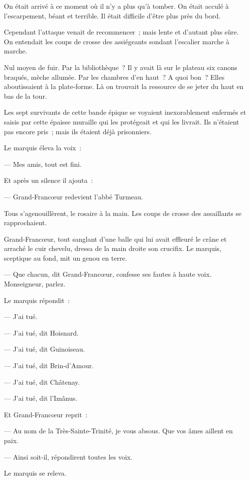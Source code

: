 \documentclass[french,twoside]{book} %
\begin{document}
On était arrivé à ce moment où il n’y a plus qu’à tomber. On était acculé à l’escarpement, béant et terrible. Il était difficile d’être plus près du bord.\par
Cependant l’attaque venait de recommencer ; mais lente et d’autant plus sûre. On entendait les coups de crosse des assiégeants sondant l’escalier marche à marche.\par
Nul moyen de fuir. Par la bibliothèque ? Il y avait là sur le plateau six canons braqués, mèche allumée. Par les chambres d’en haut ? A quoi bon ? Elles aboutissaient à la plate-forme. Là on trouvait la ressource de se jeter du haut en bas de la tour.\par
Les sept survivants de cette bande épique se  voyaient inexorablement enfermés et saisis par cette épaisse muraille qui les protégeait et qui les livrait. Ils n’étaient pas encore pris ; mais ils étaient déjà prisonniers.\par
Le marquis éleva la voix :\par
— Mes amis, tout est fini.\par
Et après un silence il ajouta :\par
— Grand-Francœur redevient l’abbé Turmeau.\par
Tous s’agenouillèrent, le rosaire à la main. Les coups de crosse des assaillants se rapprochaient.\par
Grand-Francœur, tout sanglant d’une balle qui lui avait effleuré le crâne et arraché le cuir chevelu, dressa de la main droite son crucifix. Le marquis, sceptique au fond, mit un genou en terre.\par
— Que chacun, dit Grand-Francœur, confesse ses fautes à haute voix. Monseigneur, parlez.\par
Le marquis répondit :\par
— J’ai tué.\par
— J’ai tué, dit Hoisnard.\par
— J’ai tué, dit Guinoiseau.\par
— J’ai tué, dit Brin-d’Amour.\par
— J’ai tué, dit Châtenay.\par
— J’ai tué, dit l’Imânus.\par
Et Grand-Francœur reprit :\par
— Au nom de la Très-Sainte-Trinité, je vous absous. Que vos âmes aillent en paix.\par
— Ainsi soit-il, répondirent toutes les voix.\par
Le marquis se releva.\par
\end{document}
